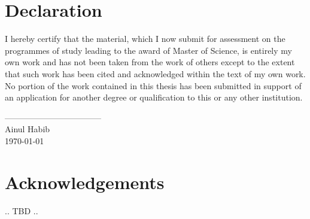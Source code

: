 \documentclass[12pt]{article}
\begin{document}
\section*{Declaration}
\begin{flushleft}
I hereby certify that the material, which I now submit for assessment on the programmes of study leading to the award of Master of Science, is entirely my own work and has not been taken from the work of others except to the extent that such work has been cited and acknowledged within the text of my own work. No portion of the work contained in this thesis has been submitted in support of an application for another degree or qualification to this or any other institution.
\end{flushleft}
\vspace{2cm}
\begin{flushright}
-----------------------------------\\
Ainul Habib\\
\today
\end{flushright}
\pagebreak

\section*{Acknowledgements}
 .. TBD ..
\pagebreak

\listoffigures
\pagebreak
 
\listoftables
\pagebreak


\tableofcontents
\pagebreak
\end{document}

